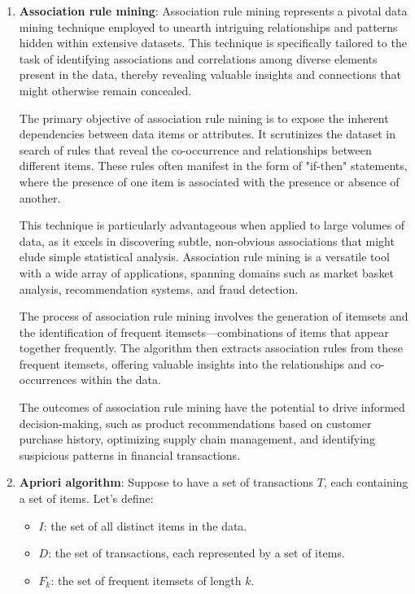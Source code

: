 \documentclass[12pt,a4paper,openright,twoside]{book}
\begin{document}
\begin{enumerate}
    \item \textbf{Association rule mining}:
    Association rule mining represents a pivotal data mining technique employed to unearth intriguing relationships and patterns hidden within extensive datasets. This technique is specifically tailored to the task of identifying associations and correlations among diverse elements present in the data, thereby revealing valuable insights and connections that might otherwise remain concealed. 

    The primary objective of association rule mining is to expose the inherent dependencies between data items or attributes. It scrutinizes the dataset in search of rules that reveal the co-occurrence and relationships between different items. These rules often manifest in the form of "if-then" statements, where the presence of one item is associated with the presence or absence of another. 

    This technique is particularly advantageous when applied to large volumes of data, as it excels in discovering subtle, non-obvious associations that might elude simple statistical analysis. Association rule mining is a versatile tool with a wide array of applications, spanning domains such as market basket analysis, recommendation systems, and fraud detection. 

    The process of association rule mining involves the generation of itemsets and the identification of frequent itemsets—combinations of items that appear together frequently. The algorithm then extracts association rules from these frequent itemsets, offering valuable insights into the relationships and co-occurrences within the data. 

    The outcomes of association rule mining have the potential to drive informed decision-making, such as product recommendations based on customer purchase history, optimizing supply chain management, and identifying suspicious patterns in financial transactions.
    

    \item \textbf{Apriori algorithm}: Suppose to have a set of transactions $T$, each containing a set of items. Let's define:

\begin{itemize}
  \item $I$: the set of all distinct items in the data.
  \item $D$: the set of transactions, each represented by a set of items.
  \item $F_k$: the set of frequent itemsets of length $k$.
\end{itemize}


\end{enumerate}
\end{document}

